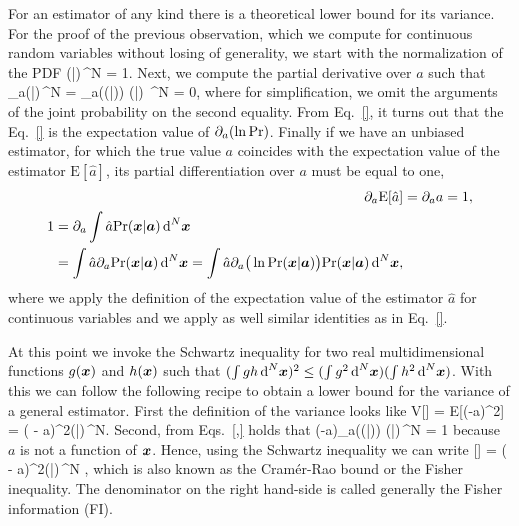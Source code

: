 For an estimator of any kind there is a theoretical lower bound for its variance.
For the proof of the previous observation, which we compute for continuous random variables without losing of generality, we start with the normalization of the PDF
\be
  \int \prob(|)\,^N = 1.
\ee
Next, we compute the partial derivative over $a$ such that
\be
  \int \partial_a\prob(|)\,^N = \int \partial_a\big(\ln  \prob(|)\big) \prob(|) \,^N = 0,
\ee
where for simplification, we omit the arguments of the joint probability on the second equality.
From Eq.~\eqref{}, it turns out that the Eq.~\eqref{} is the expectation value of $\partial_a(\ln\text{Pr})$.
Finally if we have an unbiased estimator, for which the true value $a$ coincides with the expectation value of the estimator $\text{E}[\hat{a}]$, its partial differentiation over $a$ must be equal to one,
\begin{align}
  \partial_a\text{E}[\hat{a}] &= \partial_a a = 1, \\
  \begin{split}
    1 &= \partial_a \int \hat{a} \text{Pr}(\boldsymbol{x}|\boldsymbol{a})\,\text{d}^N\boldsymbol{x} \\
      &=  \int \hat{a} \partial_a\text{Pr}(\boldsymbol{x}|\boldsymbol{a})\,\text{d}^N\boldsymbol{x} =  \int \hat{a} \partial_a\big(\ln  \text{Pr}(\boldsymbol{x}|\boldsymbol{a})\big) \text{Pr}(\boldsymbol{x}|\boldsymbol{a}) \,\text{d}^N\boldsymbol{x},
  \end{split}
\end{align}
where we apply the definition of the expectation value of the estimator $\hat{a}$ for continuous variables and we apply as well similar identities as in Eq.~\eqref{}.

At this point we invoke the Schwartz inequality for two real multidimensional functions $g(\boldsymbol{x})$ and $h(\boldsymbol{x})$ such that $(\int g h \,\text{d}^N\boldsymbol{x})^2\leq (\int g^2 \,\text{d}^N\boldsymbol{x}) (\int h^2 \,\text{d}^N\boldsymbol{x})$.
With this we can follow the following recipe to obtain a lower bound for the variance of a general estimator.
First the definition of the variance looks like
\be
  V[] = E[(-a)^2] = \int ( - a)^2\prob(|)\,^N.
\ee
Second, from Eqs.~\eqref{,} holds that
\be
  \int (-a)\partial_a\big(\ln  \prob(|)\big) \prob(|)\,^N = 1
\ee
because $a$ is not a function of $\boldsymbol{x}$.
Hence, using the Schwartz inequality we can write
\be
  \label{eq:bg-classical-cr-bound-and-fi}
  [] = \int ( - a)^2\prob(|)\,^N \geq {},
\ee
which is also known as the Cram\'er-Rao bound or the Fisher inequality.
The denominator on the right hand-side is called generally the Fisher information (FI).

